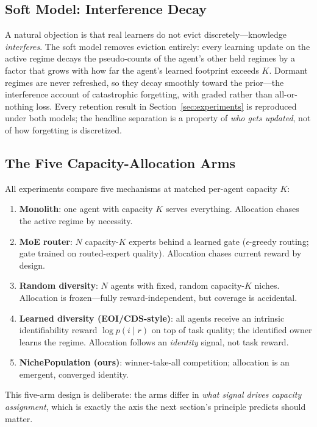\documentclass[11pt]{article}
\begin{document}
\subsection{Soft Model: Interference Decay}

A natural objection is that real learners do not evict discretely---knowledge
\emph{interferes}. The soft model removes eviction entirely: every learning
update on the active regime decays the pseudo-counts of the agent's other held
regimes by a factor that grows with how far the agent's learned footprint
exceeds $K$. Dormant regimes are never refreshed, so they decay smoothly toward
the prior---the interference account of catastrophic forgetting, with graded
rather than all-or-nothing loss. Every retention result in
Section~\ref{sec:experiments} is reproduced under both models; the headline
separation is a property of \emph{who gets updated}, not of how forgetting is
discretized.

\subsection{The Five Capacity-Allocation Arms}

All experiments compare five mechanisms at matched per-agent capacity $K$:

\begin{enumerate}[itemsep=2pt]
    \item \textbf{Monolith}: one agent with capacity $K$ serves everything.
    Allocation chases the active regime by necessity.
    \item \textbf{MoE router}: $N$ capacity-$K$ experts behind a learned gate
    ($\epsilon$-greedy routing; gate trained on routed-expert quality).
    Allocation chases current reward by design.
    \item \textbf{Random diversity}: $N$ agents with fixed, random capacity-$K$
    niches. Allocation is frozen---fully reward-independent, but coverage is
    accidental.
    \item \textbf{Learned diversity (EOI/CDS-style)}: all agents receive an
    intrinsic identifiability reward $\log p(i \mid r)$ on top of task quality;
    the identified owner learns the regime. Allocation follows an
    \emph{identity} signal, not task reward.
    \item \textbf{NichePopulation (ours)}: winner-take-all competition;
    allocation is an emergent, converged identity.
\end{enumerate}

This five-arm design is deliberate: the arms differ in \emph{what signal drives
capacity assignment}, which is exactly the axis the next section's principle
predicts should matter.
\end{document}
